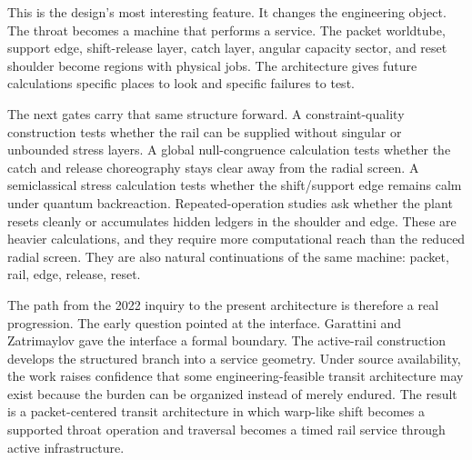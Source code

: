 \documentclass[11pt]{article}
\begin{document}
This is the design's most interesting feature. It changes the engineering object. The throat becomes a machine that performs a service. The packet worldtube, support edge, shift-release layer, catch layer, angular capacity sector, and reset shoulder become regions with physical jobs. The architecture gives future calculations specific places to look and specific failures to test.

The next gates carry that same structure forward. A constraint-quality construction tests whether the rail can be supplied without singular or unbounded stress layers. A global null-congruence calculation tests whether the catch and release choreography stays clear away from the radial screen. A semiclassical stress calculation tests whether the shift/support edge remains calm under quantum backreaction. Repeated-operation studies ask whether the plant resets cleanly or accumulates hidden ledgers in the shoulder and edge. These are heavier calculations, and they require more computational reach than the reduced radial screen. They are also natural continuations of the same machine: packet, rail, edge, release, reset.

The path from the 2022 inquiry to the present architecture is therefore a real progression. The early question pointed at the interface. Garattini and Zatrimaylov gave the interface a formal boundary. The active-rail construction develops the structured branch into a service geometry. Under source availability, the work raises confidence that some engineering-feasible transit architecture may exist because the burden can be organized instead of merely endured. The result is a packet-centered transit architecture in which warp-like shift becomes a supported throat operation and traversal becomes a timed rail service through active infrastructure.
\end{document}
